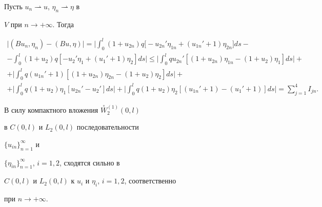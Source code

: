 \begin{pf}


Пусть $u_n \rightharpoonup{u}$, $\eta_n \rightharpoonup \eta$ в


$V$ при $n \to+\infty$. Тогда


\begin{gather*}


\big| {(B u_n, \eta_n )-(B u, \eta )} \big|=


\bigg| {\int_{0}^{l}


(1+ {u_{2n}}) q \big[-{u}_{2n}' 


\eta_{1n}+({u}_{1n}'+1) \eta_{2n}\big] ds}- \\


%


- {\int_{0}^{l}


(1+ u_{2}) q [-{u}_{2}' 


\eta_{1}+({u}_{1}'+1) \eta_{2}] ds} \bigg| \leq 


\bigg| {\int_{0}^{l}q {u}_{2n}' 


[(1+ {u_{2n}}) \eta_{1n} -(1+ {u_{2}}) \eta_{1}] ds} \bigg| + \\


%


+ \bigg| {\int_{0}^{l}q ({u}_{1n}'+1) 


[(1+ {u_{2n}}) \eta_{2n}-(1+ {u_{2}}) \eta_{2}] ds} \bigg| +\\


%


+ \bigg| {\int_{0}^{l}q(1+ {u_{2}}) \eta_{1} 


[ {u}_{2n}'-{u}_{2}' ] ds} \bigg| +


\bigg| {\int_{0}^{l}q (1+ {u_{2}}) \eta_{2} 


[ ({u}_{1n}'+1)-({u}_{1}'+1)] ds} \bigg| = 


\sum_{j=1}^{4} I_{j n}.


\end{gather*}





В силу компактного вложения $\overset{\circ}{W}{}^{(1)}_2(0, l)$


в $C(0,l)$ и $L_2(0,l)$ последовательности


$\{{u_{in}}\}_{n=1}^{\infty}$ и


$\{{\eta_{in}}\}_{n=1}^{\infty}$, $i=1, 2$, сходятся сильно в


$C(0,l)$ и $L_2(0,l)$ к $u_i$ и $\eta_i$, $i=1, 2$, соответственно


при $n \to+\infty$.






\end{pf}
